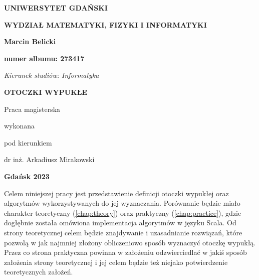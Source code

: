     \thispagestyle{empty}
    \begin{adjustwidth}{-1cm}{0cm}
    \begin{center}
    		\begin{large}
\textbf{UNIWERSYTET GDAŃSKI}

\vspace{.2 cm}
\textbf{WYDZIAŁ MATEMATYKI, FIZYKI I INFORMATYKI}
\end{large}

\vspace{3 cm}
\textbf{Marcin Belicki}

\textbf{numer albumu: 273417}
    \end{center}
    
\vspace{3 cm}
\textit{Kierunek studiów: Informatyka}

\vspace{3 cm}
\begin{center}
	\begin{large}
		\textbf{OTOCZKI WYPUKŁE}
	\end{large}
\end{center}

\vspace{3 cm}
\begin{flushright}
Praca magisterska

wykonana

pod kierunkiem

dr inż. Arkadiusz Mirakowski
\end{flushright}
\vspace{2 cm}
\begin{center}
\textbf{Gdańsk 2023}
\end{center}

    \end{adjustwidth}
    
    \tableofcontents	

  
    
    Celem niniejszej pracy jest przedstawienie definicji otoczki wypukłej oraz algorytmów wykorzystywanych do jej wyznaczania. Porównanie będzie miało charakter teoretyczny (\ref{chap:theory}) oraz praktyczny (\ref{chap:practice}), gdzie dogłębnie została omówiona implementacja algorytmów w języku Scala. Od strony teoretycznej celem będzie znajdywanie i uzasadnianie rozwiązań, które pozwolą w jak najmniej złożony obliczeniowo sposób wyznaczyć otoczkę wypukłą. Przez co strona praktyczna powinna w założeniu odzwierciedlać w jakiś sposób założenia strony teoretycznej i jej celem będzie też niejako potwierdzenie teoretycznych założeń.
    
